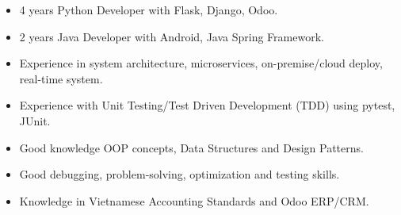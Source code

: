 

\begin{cvparagraph}

    \begin{itemize}
        \item {4 years Python Developer with Flask, Django, Odoo.}
        \item {2 years Java Developer with Android, Java Spring Framework.}
        \item {Experience in system architecture, microservices, on-premise/cloud deploy, real-time system.}
        \item {Experience with Unit Testing/Test Driven Development (TDD) using pytest, JUnit.}
        \item {Good knowledge OOP concepts, Data Structures and Design Patterns.}
        \item {Good debugging, problem-solving, optimization and testing skills.}
        \item {Knowledge in Vietnamese Accounting Standards and Odoo ERP/CRM.}
    \end{itemize}

\end{cvparagraph}
